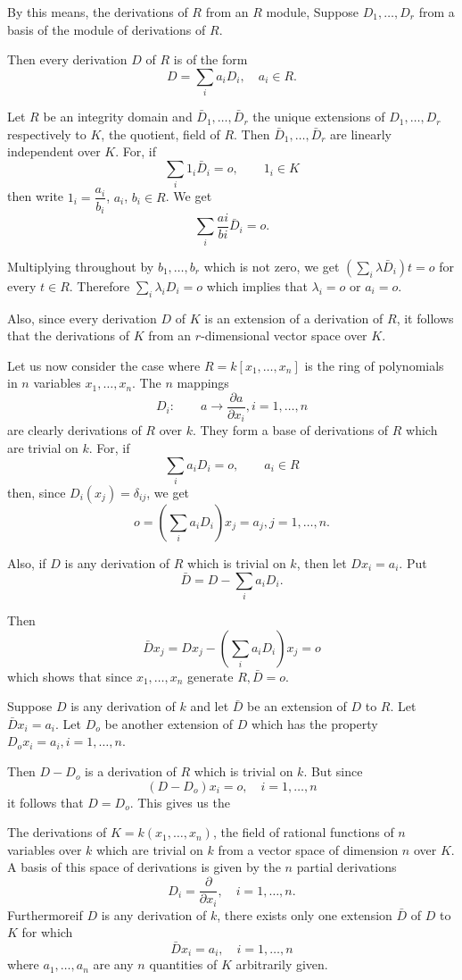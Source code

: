 By this means, the derivations of $R$ from an $R$ module, Suppose
$D_1,\ldots,D_r$ from a basis of the module of derivations of $R$. 

Then every derivation $D$ of $R$ is of the form
$$
D=\sum_i a_i D_i,\quad a_i \in R.
$$

Let $R$ be an integrity domain and $\bar{D}_1,\ldots,\bar{D}_r$ the
unique extensions of $D_1,\ldots,D_r $ respectively to $K$, the
quotient, field of $R$. Then $\bar{D}_1,\ldots,\bar{D}_r$ are linearly
independent over $K$. For, if 
$$
\sum_i 1_i \bar{D}_i = o ,\qquad 1_i\in K
$$
then write $1_i = \dfrac{a_i}{b_i}$, $a_i$, $b_i \in R$. We get
$$
\sum_i \frac{ai}{bi}\bar{D}_i = o.
$$

Multiplying throughout by $b_1,\ldots ,b_r$ which is not zero, we get
\break $(\sum \limits_i \lambda \bar{D}_i)t=o$ for every $t \in R$. Therefore
$\sum \limits_i \lambda_i D_i=o$ which implies that $\lambda_i=o$ or
$a_i=o$. 

Also, since every derivation $D$ of $K$ is an extension of a
derivation of $R$, it follows that the derivations of $K$ from an
$r$-dimensional vector space over $K$. 

Let us now consider the case where $R=k[x_1,\ldots,x_n]$ is the ring
of polynomials in $n$ variables $x_1,\ldots,x_n$. The $n$ mappings  
$$
D_i: \qquad a \to \frac{\partial a}{\partial x_i}, i=1,\ldots,n 
$$\pageoriginale
are clearly derivations of $R$ over $k$. They form a base of
derivations of $R$ which are trivial on $k$. For, if  
$$
\sum_i a_i D_i =o, \qquad a_i \in R
$$
then, since $D_i(x_j)=\delta_{ij}$, we get
$$
o =(\sum_i a_i D_i) x_j =a_j,j=1,\ldots,n.
$$

Also, if $D$ is any derivation of $R$ which is trivial on $k$, then
let $Dx_i=a_i$. Put 
$$
\bar{D}=D-\sum_i a_i D_i.
$$

Then
 $$
 \bar{D}x_j=Dx_j -(\sum_i a_i D_i)x_j=o
 $$
 which shows that since $x_1,\ldots,x_n$ generate $R,\bar{D}=o$. 
 
 Suppose $D$ is any derivation of $k$ and let $\bar{D}$ be an
 extension of $D$ to $R$. Let $\bar{D}x_i=a_i$. Let $D_o$ be another
 extension of $D$ which has the property $D_ox_i=a_i, i=1,\ldots,n$. 
 
 Then $D-D_o$ is a derivation of $R$ which is trivial on $k$. But since
 $$
 (D-D_o)x_i=o,\quad i=1,\ldots,n
 $$
 it follows that $D=D_o$. This gives us the
 
\begin{thm}\label{c3:thm5}%
 The derivations of $K=k(x_1,\ldots,x_n)$, the field of rational
  functions of $n$ variables over $k$ which are trivial on $k$ from a
  vector space of dimension $n$ over $K$. A basis of this space of
  derivations is given by the $n$ partial derivations 
$$
D_i=\frac{\partial}{\partial x_i}, \quad i=1,\ldots,n.
$$
 Furthermore\pageoriginale if $D$ is any derivation of $k$, there
 exists only   one extension $\bar{D}$ of $D$ to $K$ for which  
$$
\bar{D}x_i = a_i,\quad i=1,\ldots,n
$$
 where $a_1,\ldots,a_n$ are any $n$ quantities of $K$ arbitrarily given.
 \end{thm} 
 
